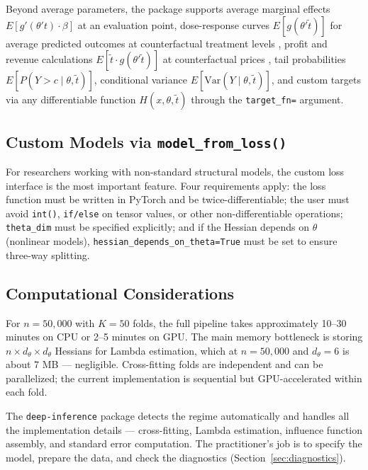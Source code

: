 Beyond average parameters, the package supports average marginal effects $E[g'(\theta' t) \cdot \beta]$ at an evaluation point, dose-response curves $E[g(\theta' \tilde{t})]$ for average predicted outcomes at counterfactual treatment levels \citep{colangelo2026continuous}, profit and revenue calculations $E[\tilde{t} \cdot g(\theta' \tilde{t})]$ at counterfactual prices \citep{dube2023personalized}, tail probabilities $E[P(Y > c \mid \theta, \tilde{t})]$, conditional variance $E[\mathrm{Var}(Y \mid \theta, \tilde{t})]$, and custom targets via any differentiable function $H(x, \theta, \tilde{t})$ through the \texttt{target\_fn=} argument.

\subsection{Custom Models via \texttt{model\_from\_loss()}}

For researchers working with non-standard structural models, the custom loss interface is the most important feature. Four requirements apply: the loss function must be written in PyTorch and be twice-differentiable; the user must avoid \texttt{int()}, \texttt{if/else} on tensor values, or other non-differentiable operations; \texttt{theta\_dim} must be specified explicitly; and if the Hessian depends on $\theta$ (nonlinear models), \texttt{hessian\_depends\_on\_theta=True} must be set to ensure three-way splitting.

\subsection{Computational Considerations}

For $n = 50{,}000$ with $K = 50$ folds, the full pipeline takes approximately 10--30 minutes on CPU or 2--5 minutes on GPU. The main memory bottleneck is storing $n \times d_\theta \times d_\theta$ Hessians for Lambda estimation, which at $n = 50{,}000$ and $d_\theta = 6$ is about 7 MB --- negligible. Cross-fitting folds are independent and can be parallelized; the current implementation is sequential but GPU-accelerated within each fold.

The \texttt{deep-inference} package detects the regime automatically and handles all the implementation details --- cross-fitting, Lambda estimation, influence function assembly, and standard error computation. The practitioner's job is to specify the model, prepare the data, and check the diagnostics (Section~\ref{sec:diagnostics}).
